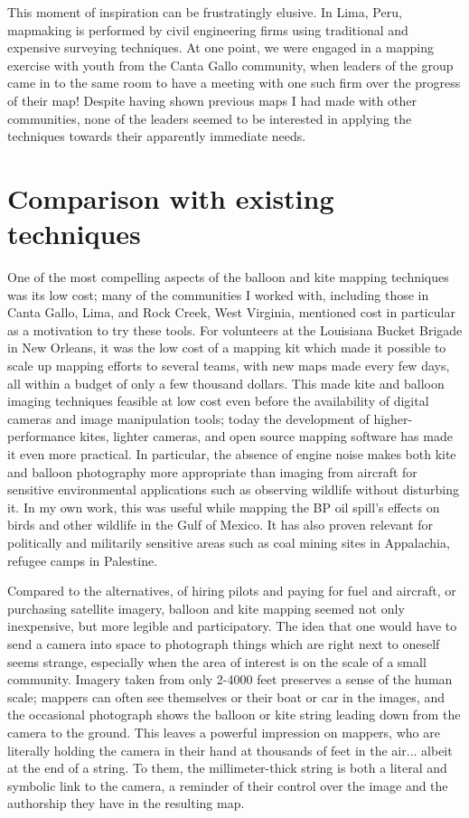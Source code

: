 \documentclass[11pt,oneside,notitlepage]{report}
\begin{document}
{{This moment of inspiration can be frustratingly elusive. In Lima, Peru, mapmaking is performed by civil engineering firms using traditional and expensive surveying techniques. At one point, we were engaged in a mapping exercise with youth from the Canta Gallo community, when leaders of the group came in to the same room to have a meeting with one such firm over the progress of their map! Despite having shown previous maps I had made with other communities, none of the leaders seemed to be interested in applying the techniques towards their apparently immediate needs. 
 
\section{Comparison with existing techniques}

One of the most compelling aspects of the balloon and kite mapping techniques was its low cost; many of the communities I worked with, including those in Canta Gallo, Lima, and Rock Creek, West Virginia, mentioned cost in particular as a motivation to try these tools. For volunteers at the Louisiana Bucket Brigade in New Orleans, it was the low cost of a mapping kit which made it possible to scale up mapping efforts to several teams, with new maps made every few days, all within a budget of only a few thousand dollars. This made kite and balloon imaging techniques feasible at low cost even before the availability of digital cameras and image manipulation tools; today the development of higher-performance kites, lighter cameras, and open source mapping software has made it even more practical. In particular, the absence of engine noise makes both kite and balloon photography more appropriate than imaging from aircraft for sensitive environmental applications such as observing wildlife without disturbing it. \cite{aber1999kite} In my own work, this was useful while mapping the BP oil spill's effects on birds and other wildlife in the Gulf of Mexico. It has also proven relevant for politically and militarily sensitive areas such as coal mining sites in Appalachia, refugee camps in Palestine.

Compared to the alternatives, of hiring pilots and paying for fuel and aircraft, or purchasing satellite imagery, balloon and kite mapping seemed not only inexpensive, but more legible and participatory. The idea that one would have to send a camera into space to photograph things which are right next to oneself seems strange, especially when the area of interest is on the scale of a small community. Imagery taken from only 2-4000 feet preserves a sense of the human scale; mappers can often see themselves or their boat or car in the images, and the occasional photograph shows the balloon or kite string leading down from the camera to the ground. This leaves a powerful impression on mappers, who are literally holding the camera in their hand at thousands of feet in the air... albeit at the end of a string. To them, the millimeter-thick string is both a literal and symbolic link to the camera, a reminder of their control over the image and the authorship they have in the resulting map.  

}}
\end{document}
